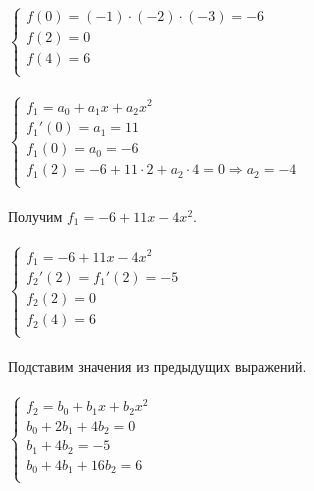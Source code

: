 \documentclass[12pt]{article}
\begin{document}
	$  
	\left\{  
	\begin{array}{lcl}
	f(0)=(-1)\cdot (-2)\cdot (-3)=-6\\
	f(2)=0\\
	f(4)=6\\
	\end{array}   
	\right.  
	$
	\\ \\
	$  
	\left\{  
	\begin{array}{lcl}
	f_1 = a_0+a_1x+a_2x^2\\
	f_1'(0) = a_1 = 11\\
	f_1(0) = a_0 = -6\\
	f_1(2) = -6+11\cdot 2+a_2\cdot 4 = 0 \Rightarrow a_2 = -4\\
	\end{array}   
	\right.  
	$
	\\ \\
	Получим $f_1 = -6+11x-4x^2$. \\ \\
	$  
	\left\{  
	\begin{array}{lcl}
	f_1 = -6+11x-4x^2\\
	f_2'(2) = f_1'(2) = -5\\
	f_2(2) = 0\\
	f_2(4) = 6\\
	\end{array}   
	\right.  
	$
	\\ ~\\
	Подставим значения из предыдущих выражений.\\ \\
	$
	\left\{  
	\begin{array}{lcl}
	f_2 = b_0+b_1x+b_2x^2\\
	b_0+2b_1+4b_2 = 0\\
	b_1+4b_2 = -5\\
	b_0+4b_1+16b_2 = 6\\
	\end{array}   
	\right.  
	$
	\\ \\
\end{document}
